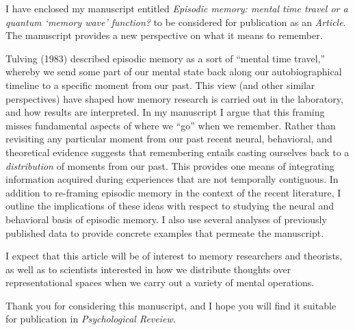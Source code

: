 \documentclass[11pt,stdletter,orderfromtodate,sigleft]{newlfm}
\begin{document}
\begin{newlfm}
I have enclosed my manuscript entitled \textit{Episodic memory: mental time travel or a quantum `memory wave' function?} to be considered for publication as an \textit{Article}.  The manuscript provides a new perspective on what it means to remember.

Tulving (1983) described episodic memory as a sort of ``mental time travel,'' whereby we send some part of our mental state back along our autobiographical timeline to a specific moment from our past.  This view (and other similar perspectives) have shaped how memory research is carried out in the laboratory, and how results are interpreted.  In my manuscript I argue that this framing misses fundamental aspects of where we ``go'' when we remember.  Rather than revisiting any particular moment from our past recent neural, behavioral, and theoretical evidence suggests that remembering entails casting ourselves back to a \textit{distribution} of moments from our past.  This provides one means of integrating information acquired during experiences that are not temporally contiguous.  In addition to re-framing episodic memory in the context of the recent literature, I outline the implications of these ideas with respect to studying the neural and behavioral basis of episodic memory.  I also use several analyses of previously published data to provide concrete examples that permeate the manuscript.

I expect that this article will be of interest to memory researchers and theorists, as well as to scientists interested in how we distribute thoughts over representational spaces when we carry out a variety of mental operations.

Thank you for considering this manuscript, and I hope you will find it suitable for publication in \textit{Psychological Reveiew}.


\end{newlfm}
\end{document}
